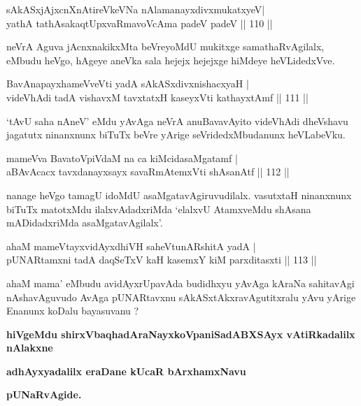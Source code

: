 \begin{shl}
sAkASxjAjxcnXnAtireVkeVNa nAlamanayxdivxmukatxyeV|\\
yathA tathA\s sakaqtUpxvaRmavoVcAma padeV padeV \hfill || 110 || 
\end{shl}

\begin{artha}
neVrA Aguva jAcnxnakikxMta beVreyoMdU mukitxge samathaRvAgilalx, eMbudu heVgo, hAgeye aneVka sala hejejx hejejxge hiMdeye heVLidedxVve.
\end{artha}


\begin{shl}
BavAnapayxhameVveVti yadA sAkASxdivxnishacxyaH |\\
videVhAdi tadA vishavxM tavxtatxH kaseyxVti kathayxtAmf \hfill || 111 || 
\end{shl}

\begin{artha}
`tAvU saha nAneV' eMdu yAvAga neVrA anuBavavAyito videVhAdi dheVshavu jagatutx ninanxnunx biTuTx beVre yArige seVridedxMbudanunx heVLabeVku.
\end{artha}


\begin{shl}
mameVva BavatoV\s piVdaM na ca kiMcidasaMgatamf |\\
aBAvAcacx tavxdanayxsayx savaRmAtemxVti shAsanAtf  \hfill || 112 || 
\end{shl}

\begin{artha}
nanage heVgo tamagU idoMdU asaMgatavAgiruvudilalx. vasutxtaH ninanxnunx biTuTx matotxMdu ilalxvAdadxriMda `elalxvU AtamxveMdu shAsana mADidadxriMda asaMgatavAgilalx'.
\end{artha}

\begin{shl}
ahaM mameVtayxvidAyxdhiVH saheVtunARshitA yadA |\\
pUNARtamxni tadA daqSeTxV kaH kasemxY kiM parxditasxti \hfill || 113 || 
\end{shl}

\begin{artha}
ahaM mama' eMbudu avidAyxrUpavAda budidhxyu yAvAga kAraNa sahitavAgi nAshavAguvudo AvAga pUNARtavxnu sAkASxtAkxravAgutitxralu yAvu yArige Enanunx koDalu bayasuvanu ?
\end{artha}

\begin{center}
{\bf hiVgeMdu shirxVbaqhadAraNayxkoVpaniSadABXSAyx vAtiRkadalilx nAlakxne}

\smallskip
{\bf adhAyxyadalilx eraDane kUcaR bArxhamxNavu}

\smallskip
{\bf pUNaRvAgide.}
\end{center}
